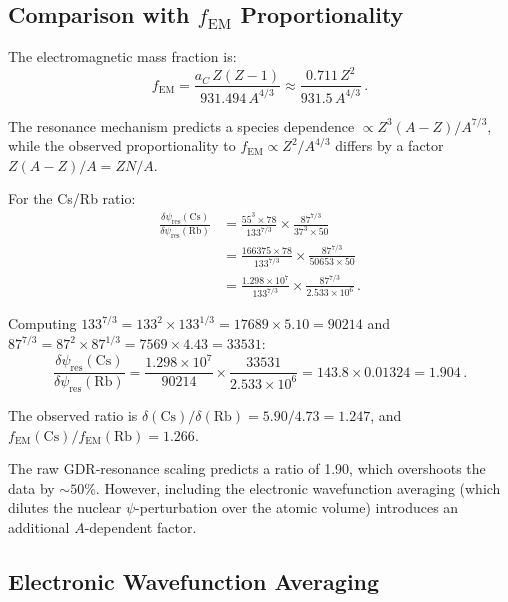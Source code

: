 \documentclass[aps,prd,twocolumn,superscriptaddress,nofootinbib]{revtex4-2}
\newcommand{\ee}[1]{\times 10^{#1}}
\newcommand{\fEM}{f_{\mathrm{EM}}}
\newcommand{\dpsi}{\delta\psi}
\begin{document}
\subsection{Comparison with $\fEM$ Proportionality}
\label{sec:fem-compare}

The electromagnetic mass fraction is:
\begin{equation}
\fEM = \frac{a_C\,Z(Z-1)}{931.494\,A^{4/3}} \approx
\frac{0.711\,Z^2}{931.5\,A^{4/3}}\,.
\end{equation}

The resonance mechanism predicts a species dependence
$\propto Z^3(A-Z)/A^{7/3}$, while the observed proportionality to
$\fEM \propto Z^2/A^{4/3}$ differs by a factor
$Z(A-Z)/A = ZN/A$.

For the Cs/Rb ratio:
\begin{align}
\frac{\dpsi_{\mathrm{res}}(\mathrm{Cs})}
{\dpsi_{\mathrm{res}}(\mathrm{Rb})}
&= \frac{55^3 \times 78}{133^{7/3}} \times
\frac{87^{7/3}}{37^3 \times 50}\\
&= \frac{166375 \times 78}{133^{7/3}} \times
\frac{87^{7/3}}{50653 \times 50}\\
&= \frac{1.298\ee{7}}{133^{7/3}} \times
\frac{87^{7/3}}{2.533\ee{6}}\,.
\end{align}

Computing $133^{7/3} = 133^2 \times 133^{1/3} = 17689 \times 5.10
= 90214$ and $87^{7/3} = 87^2 \times 87^{1/3} = 7569 \times 4.43
= 33531$:
\begin{equation}
\frac{\dpsi_{\mathrm{res}}(\mathrm{Cs})}
{\dpsi_{\mathrm{res}}(\mathrm{Rb})}
= \frac{1.298\ee{7}}{90214} \times \frac{33531}{2.533\ee{6}}
= 143.8 \times 0.01324 = 1.904\,.
\end{equation}

The observed ratio is $\delta(\mathrm{Cs})/\delta(\mathrm{Rb})
= 5.90/4.73 = 1.247$, and $\fEM(\mathrm{Cs})/\fEM(\mathrm{Rb})
= 1.266$.

The raw GDR-resonance scaling predicts a ratio of 1.90, which
overshoots the data by $\sim\!50\%$.  However, including the
electronic wavefunction averaging (which dilutes the nuclear
$\psi$-perturbation over the atomic volume) introduces an additional
$A$-dependent factor.

\subsection{Electronic Wavefunction Averaging}
\label{sec:wfn-average}
\end{document}

